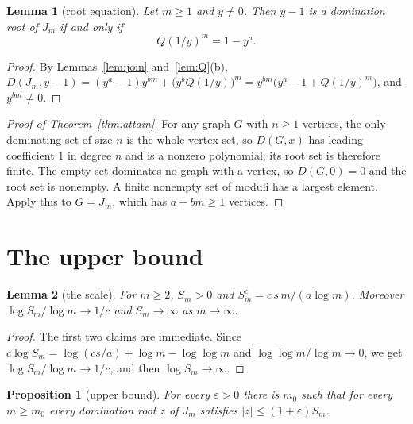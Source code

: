 \documentclass[11pt]{article}
\newtheorem{lemma}{Lemma}
\newtheorem{proposition}{Proposition}
\theoremstyle{definition}
\theoremstyle{remark}
\begin{document}
\begin{lemma}[root equation]\label{lem:rooteq}
Let $m\ge1$ and $y\ne0$. Then $y-1$ is a domination root of $J_m$ if and only
if
\[
Q(1/y)^m=1-y^a .
\]
\end{lemma}

\begin{proof}
By Lemmas~\ref{lem:join} and~\ref{lem:Q}(b),
$D(J_m,y-1)=(y^a-1)y^{bm}+\bigl(y^bQ(1/y)\bigr)^m
=y^{bm}\bigl(y^a-1+Q(1/y)^m\bigr)$, and $y^{bm}\ne0$.
\end{proof}

\begin{proof}[Proof of Theorem~\ref{thm:attain}]
For any graph $G$ with $n\ge1$ vertices, the only dominating set of size $n$
is the whole vertex set, so $D(G,x)$ has leading coefficient $1$ in degree
$n$ and is a nonzero polynomial; its root set is therefore finite. The empty
set dominates no graph with a vertex, so $D(G,0)=0$ and the root set is
nonempty. A finite nonempty set of moduli has a largest element. Apply this
to $G=J_m$, which has $a+bm\ge1$ vertices.
\end{proof}

\section{The upper bound}\label{sec:upper}

\begin{lemma}[the scale]\label{lem:scale}
For $m\ge2$, $S_m>0$ and $S_m^c=c\,s\,m/(a\log m)$. Moreover
$\log S_m/\log m\to1/c$ and $S_m\to\infty$ as $m\to\infty$.
\end{lemma}

\begin{proof}
The first two claims are immediate. Since
$c\log S_m=\log(cs/a)+\log m-\log\log m$ and $\log\log m/\log m\to0$, we get
$\log S_m/\log m\to1/c$, and then $\log S_m\to\infty$.
\end{proof}

\begin{proposition}[upper bound]\label{prop:upper}
For every $\varepsilon>0$ there is $m_0$ such that for every $m\ge m_0$ every
domination root $z$ of $J_m$ satisfies $|z|\le(1+\varepsilon)S_m$.
\end{proposition}
\end{document}
